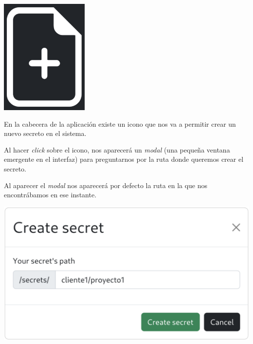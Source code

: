 \documentclass{\ClassPath/viu-tfm-template}
\begin{document}
{
\begin{minipage}{0.1\linewidth}
    \includegraphics[width=\linewidth]{img/new.png}
\end{minipage}
\hspace{0.5cm}
\begin{minipage}{0.9\linewidth}
    En la cabecera de la aplicación existe un icono que nos va a permitir crear un nuevo secreto en el sistema.

    Al hacer \textit{click} sobre el icono, nos aparecerá un \textit{modal} (una pequeña ventana emergente en el interfaz) para preguntarnos por la ruta donde queremos crear el secreto.
\end{minipage}
}

Al aparecer el \textit{modal} nos aparecerá por defecto la ruta en la que nos encontrábamos en ese instante.

\begin{center}
    \includegraphics[width=0.7\linewidth]{img/new_secret.png}
\end{center}
\end{document}
